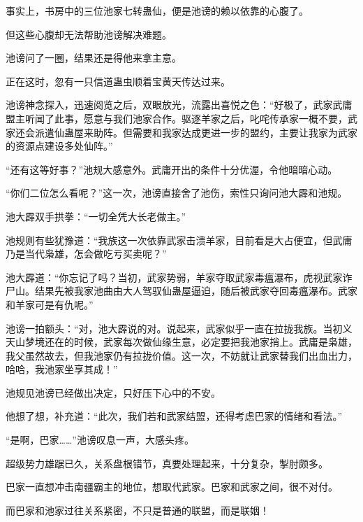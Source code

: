 \begin{this_body}
事实上，书房中的三位池家七转蛊仙，便是池谤的赖以依靠的心腹了。

但这些心腹却无法帮助池谤解决难题。

池谤问了一圈，结果还是得他来拿主意。

正在这时，忽有一只信道蛊虫顺着宝黄天传达过来。

池谤神念探入，迅速阅览之后，双眼放光，流露出喜悦之色：“好极了，武家武庸盟主听闻了此事，愿意与我们池家合作。驱逐羊家之后，叱咤传承家一概不要，武家还会派遣仙蛊屋来助阵。但需要和我家达成更进一步的盟约，主要让我家为武家的资源点建设多处仙阵。”

“还有这等好事？”池规大感意外。武庸开出的条件十分优渥，令他暗暗心动。

“你们二位怎么看呢？”这一次，池谤直接舍了池伤，索性只询问池大霹和池规。

池大霹双手拱拳：“一切全凭大长老做主。”

池规则有些犹豫道：“我族这一次依靠武家击溃羊家，目前看是大占便宜，但武庸乃是当代枭雄，怎会做吃亏买卖呢？”

池大霹道：“你忘记了吗？当初，武家势弱，羊家夺取武家毒瘟瀑布，虎视武家诈尸山。结果先被我家池曲由大人驾驭仙蛊屋逼迫，随后被武家夺回毒瘟瀑布。武家和羊家可是有仇呢。”

池谤一拍额头：“对，池大霹说的对。说起来，武家似乎一直在拉拢我族。当初义天山梦境还在的时候，武家每次做仙缘生意，必定要把我池家捎上。武庸是枭雄，我父虽然故去，但我池家仍有拉拢价值。这一次，不妨就让武家替我们出血出力，哈哈，我池家坐享其成！”

池规见池谤已经做出决定，只好压下心中的不安。

他想了想，补充道：“此次，我们若和武家结盟，还得考虑巴家的情绪和看法。”

“是啊，巴家……”池谤叹息一声，大感头疼。

超级势力雄踞已久，关系盘根错节，真要处理起来，十分复杂，掣肘颇多。

巴家一直想冲击南疆霸主的地位，想取代武家。巴家和武家之间，很不对付。

而巴家和池家过往关系紧密，不只是普通的联盟，而是联姻！

\end{this_body}

